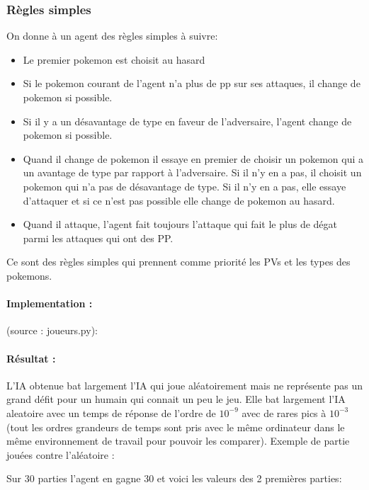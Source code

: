 		\subsubsection{Règles simples}
			On donne à un agent des règles simples à suivre:
			\begin{itemize}
				\item Le premier pokemon est choisit au hasard
				\item Si le pokemon courant de l'agent n'a plus de pp sur ses attaques, il change de pokemon si possible.
				\item Si il y a un désavantage de type en faveur de l'adversaire, l'agent change de pokemon si possible.
				\item Quand il change de pokemon il essaye en premier de choisir un pokemon qui a un avantage de type par rapport à l'adversaire. Si il n'y en a pas, il choisit 						un pokemon qui n'a pas de désavantage de type. Si il n'y en a pas, elle essaye d'attaquer et si ce n'est pas possible elle change de pokemon au hasard. 
				\item Quand il attaque, l'agent fait toujours l'attaque qui fait le plus de dégat parmi les attaques qui ont des PP.
			\end{itemize}
			Ce sont des règles simples qui prennent comme priorité les PVs et les types des pokemons.
			\paragraph{Implementation :}
			    (source : joueurs.py): 
				
				
			\paragraph{Résultat :} 
				L'IA obtenue bat largement l'IA qui joue aléatoirement mais ne représente pas un grand défit pour un humain qui connait un peu le jeu.
				Elle bat largement l'IA aleatoire avec un temps de réponse de l'ordre de $10^{-9}$ avec de rares pics à $10^{-3}$ (tout les ordres grandeurs de temps sont 							pris avec le même ordinateur dans le même environnement de travail pour pouvoir les comparer).
				Exemple de partie jouées contre l'aléatoire :
		
				Sur 30 parties l'agent en gagne 30 et voici les valeurs des 2 premières parties:

